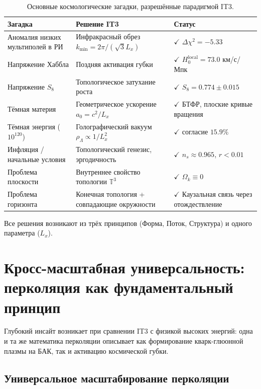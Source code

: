 \documentclass[12pt,a4paper]{article}
\begin{document}
\begin{table}[t]
\centering
\caption{Основные космологические загадки, разрешённые парадигмой IT3.}
\label{tab:resolved}
\begin{tabular}{@{} >{\raggedright\arraybackslash}p{4.5cm} >{\centering\arraybackslash}p{6.5cm} >{\raggedright\arraybackslash}p{4cm} @{}}
\toprule
\textbf{Загадка} & \textbf{Решение IT3} & \textbf{Статус} \\
\midrule
Аномалия низких мультиполей в РИ & Инфракрасный обрез $k_{\min} = 2\pi/(\sqrt{3}L_x)$ & $\checkmark$ $\Delta\chi^2 = -5.33$ \\
Напряжение Хаббла & Поздняя активация губки & $\checkmark$ $H_0^{\mathrm{local}} = 73.0$ км/с/Мпк \\
Напряжение $S_8$ & Топологическое затухание роста & $\checkmark$ $S_8 = 0.774 \pm 0.015$ \\
Тёмная материя & Геометрическое ускорение $a_0 = c^2/L_x$ & $\checkmark$ БТФР, плоские кривые вращения \\
Тёмная энергия ($10^{120}$) & Голографический вакуум $\rho_\Lambda \propto 1/L_x^2$ & $\checkmark$ согласие $15.9\%$ \\
Инфляция / начальные условия & Топологический генезис, эргодичность & $\checkmark$ $n_s \approx 0.965$, $r < 0.01$ \\
Проблема плоскости & Внутреннее свойство топологии $\mathbb{T}^3$ & $\checkmark$ $\Omega_k \equiv 0$ \\
Проблема горизонта & Конечная топология + совпадающие окружности & $\checkmark$ Каузальная связь через отождествление \\
\bottomrule
\end{tabular}
\end{table}

Все решения возникают из трёх принципов (Форма, Поток, Структура) и одного параметра ($L_x$).

\section{Кросс-масштабная универсальность: перколяция как фундаментальный принцип}

Глубокий инсайт возникает при сравнении IT3 с физикой высоких энергий: одна и та же математика перколяции описывает как формирование кварк-глюонной плазмы на БАК, так и активацию космической губки.

\subsection{Универсальное масштабирование перколяции}
\end{document}
